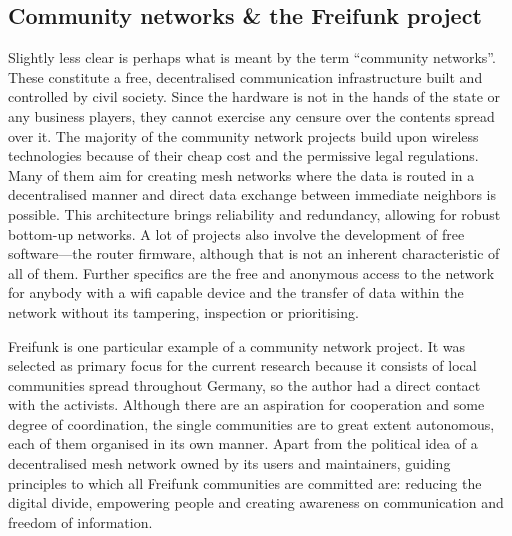 \documentclass{scrartcl}
\begin{document}
\subsection{Community networks \& the Freifunk project}
Slightly less clear is perhaps what is meant by the term ``community networks''.
These constitute a free, decentralised communication infrastructure built and controlled by civil society.
Since the hardware is not in the hands of the state or any business players, they cannot exercise any censure over the contents spread over it. %
The majority of the community network projects build upon wireless technologies because of their cheap cost and the permissive legal regulations\cite{WNDW2013}\cite{Medosch2004}.
Many of them aim for creating mesh networks where the data is routed in a decentralised manner and direct data exchange between immediate neighbors is possible.
This architecture brings reliability and redundancy, allowing for robust bottom-up networks\cite{Medosch2004}.
A lot of projects also involve the development of free software---the router firmware, although that is not an inherent characteristic of all of them.
Further specifics are the free and anonymous access to the network for anybody with a wifi capable device and the transfer of data within the network without its tampering, inspection or prioritising\cite{ffweb}\cite{Medosch2004}. %

Freifunk is one particular example of a community network project.
It was selected as primary focus for the current research because it consists of local communities spread throughout Germany, so the author had a direct contact with the activists.
Although there are an aspiration for cooperation and some degree of coordination, the single communities are to great extent autonomous, each of them organised in its own manner.
Apart from the political idea of a decentralised mesh network owned by its users and maintainers, guiding principles to which all Freifunk communities are committed are: reducing the digital divide, empowering people and creating awareness on communication and freedom of information\cite{ffweb}.
\end{document}
